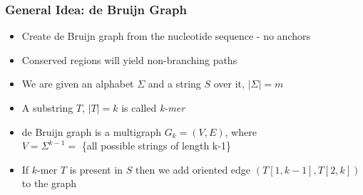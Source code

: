 \documentclass[svgnames,14pt]{beamer}
\begin{document}


\begin{frame}
\frametitle{General Idea: de Bruijn Graph}
\begin{itemize}
\item Create de Bruijn graph from the nucleotide sequence - no anchors
\item Conserved regions will yield non-branching paths
\item We are given an alphabet \( \Sigma \) and a string \( S \) over it, \(|\Sigma| = m \)
\item A substring \( T, \, |T| = k \) is called \textit{k-mer}
\item de Bruijn graph is a multigraph \( G_{k} = (V, E) \), where \\
\( V = \Sigma^{k - 1} = \) \{all possible strings of length k-1\} \\
\item If \(k\)-mer \( T \) is present in \( S \) then we add oriented edge \( (T[1, k - 1], T[2, k]) \) to the graph
\end{itemize}
\end{frame}
\end{document}
